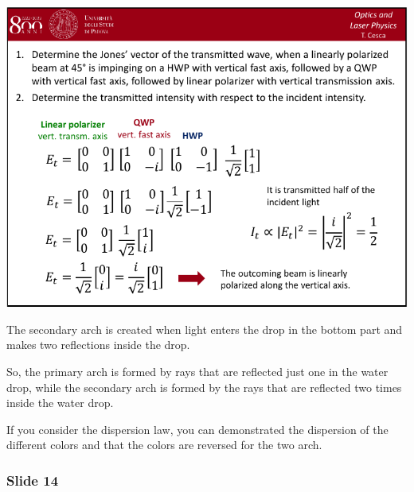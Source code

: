 \documentclass[../main/main.tex]{subfiles}
\begin{document}
\begin{minipage}[]{0.5\linewidth}
\centering
\includegraphics[page=13,width=1\textwidth]{../lessons/pdf_file/04_lecture.pdf}
\end{minipage}
\hspace{0.3cm}\vspace{0.3cm}
\begin{minipage}[c]{0.47\linewidth}

The secondary arch is created when light enters the drop in the bottom part and makes two reflections inside the drop.

So, the primary arch is formed by rays that are reflected just one in the water drop, while the secondary arch is formed by the rays that are reflected two times inside the water drop.

If you consider the dispersion law, you can demonstrated the dispersion of the different colors and that the colors are reversed for the two arch.


\end{minipage}

\subsubsection*{Slide 14}
\end{document}
